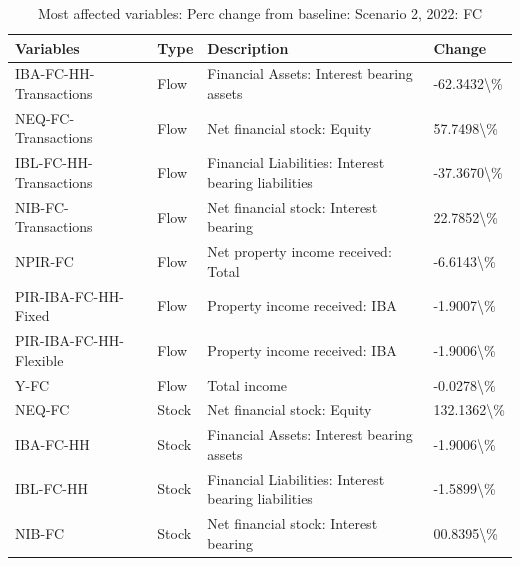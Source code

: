 \documentclass[
]{book}
\begin{document}
\begin{table}

\caption{\label{tab:most-affected-scenario-2-perc-FC}Most affected variables: Perc change from baseline: Scenario 2, 2022: FC}
\centering
\fontsize{10}{12}\selectfont
\begin{tabular}[t]{l|l|l|l}
\hline
Variables & Type & Description & Change\\
\hline
IBA-FC-HH-Transactions & Flow & Financial Assets: Interest bearing assets & -62.3432\textbackslash{}\%\\
\hline
NEQ-FC-Transactions & Flow & Net financial stock: Equity & 57.7498\textbackslash{}\%\\
\hline
IBL-FC-HH-Transactions & Flow & Financial Liabilities: Interest bearing liabilities & -37.3670\textbackslash{}\%\\
\hline
NIB-FC-Transactions & Flow & Net financial stock: Interest bearing & 22.7852\textbackslash{}\%\\
\hline
NPIR-FC & Flow & Net property income received: Total & -6.6143\textbackslash{}\%\\
\hline
PIR-IBA-FC-HH-Fixed & Flow & Property income received: IBA & -1.9007\textbackslash{}\%\\
\hline
PIR-IBA-FC-HH-Flexible & Flow & Property income received: IBA & -1.9006\textbackslash{}\%\\
\hline
Y-FC & Flow & Total income & -0.0278\textbackslash{}\%\\
\hline
NEQ-FC & Stock & Net financial stock: Equity & 132.1362\textbackslash{}\%\\
\hline
IBA-FC-HH & Stock & Financial Assets: Interest bearing assets & -1.9006\textbackslash{}\%\\
\hline
IBL-FC-HH & Stock & Financial Liabilities: Interest bearing liabilities & -1.5899\textbackslash{}\%\\
\hline
NIB-FC & Stock & Net financial stock: Interest bearing & 00.8395\textbackslash{}\%\\
\hline
\end{tabular}
\end{table}
\end{document}
